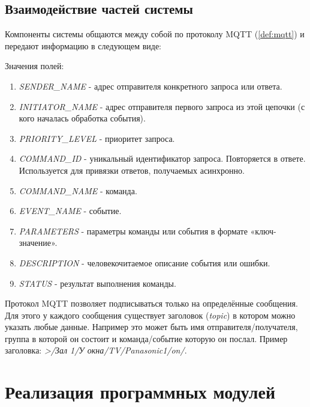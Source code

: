 \subsection{Взаимодействие частей системы}

Компоненты системы общаются между собой по протоколу MQTT (\ref{def:mqtt}) и передают информацию в следующем виде:





\noindent Значения полей:

\begin{enumerate}
    \item \textit{SENDER\_NAME} - адрес отправителя конкретного запроса или ответа.
    \item \textit{INITIATOR\_NAME} - адрес отправителя первого запроса из этой цепочки (с кого началась обработка события).
    \item \textit{PRIORITY\_LEVEL} - приоритет запроса.
    \item \textit{COMMAND\_ID} - уникальный идентификатор запроса. Повторяется в ответе.
    Используется для привязки ответов, получаемых асинхронно.
    \item \textit{COMMAND\_NAME} - команда.
    \item \textit{EVENT\_NAME} - событие.
    \item \textit{PARAMETERS} - параметры команды или события в формате «ключ-значение».
    \item \textit{DESCRIPTION} - человекочитаемое описание события или ошибки.
    \item \textit{STATUS} - результат выполнения команды.
\end{enumerate}

\noindent Протокол MQTT позволяет подписываться только на определённые сообщения. Для этого у каждого сообщения существует
заголовок (\textit{topic}) в котором можно указать любые данные. Например это может быть имя отправителя/получателя,
группа в которой он состоит и команда/событие которую он послал. Пример заголовка: \textit{>/Зал 1/У окна/TV/Panasonic1/on/}.

\clearpage

\section{Реализация программных модулей}

